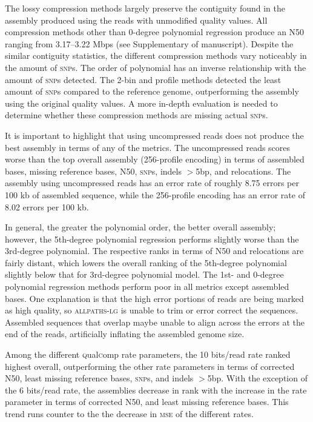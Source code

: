 The lossy compression methods largely preserve the contiguity found in
the assembly produced using the reads with unmodified quality
values. All compression methods other than 0-degree polynomial
regression produce an N50 ranging from 3.17--3.22 Mbps (see
Supplementary of manuscript). Despite the similar contiguity statistics,
the different compression methods vary noticeably in the amount of
\textsc{snp}s. The order of polynomial has an inverse relationship
with the amount of \textsc{snp}s detected. The 2-bin and profile
methods detected the least amount of \textsc{snp}s compared to the
reference genome, outperforming the assembly using the original
quality values. A more in-depth evaluation is needed to determine
whether these compression methods are missing actual \textsc{snp}s.

It is important to highlight that using uncompressed reads does not
produce the best assembly in terms of any of the metrics. The
uncompressed reads scores worse than the top overall assembly
(256-profile encoding) in terms of assembled bases, missing reference
bases, N50, \textsc{snp}s, indels $>$5bp, and relocations. The
assembly using uncompressed reads has an error rate of roughly 8.75
errors per 100 kb of assembled sequence, while the 256-profile
encoding has an error rate of 8.02 errors per 100 kb.

In general, the greater the polynomial order, the better overall
assembly; however, the 5th-degree polynomial regression performs
slightly worse than the 3rd-degree polynomial. The respective ranks in
terms of N50 and relocations are fairly distant, which lowers the
overall ranking of the 5th-degree polynomial slightly below that for
3rd-degree polynomial model. The 1st- and 0-degree polynomial
regression methods perform poor in all metrics except assembled bases.
One explanation is that the high error portions of reads are being
marked as high quality, so \textsc{allpaths-lg} is unable to trim or
error correct the sequences. Assembled sequences that overlap maybe
unable to align across the errors at the end of the reads, artificially
inflating the assembled genome size.

Among the different \textsc{q}ual\textsc{c}omp rate parameters, the 10 bits/read rate
ranked highest overall, outperforming the other rate parameters in
terms of corrected N50, least missing reference bases, \textsc{snp}s,
and indels $>$5bp. With the exception of the 6 bits/read rate, the
assemblies decrease in rank with the increase in the rate parameter in
terms of corrected N50, and least missing reference bases. This trend
runs counter to the the decrease in \textsc{mse} of the different
rates.


